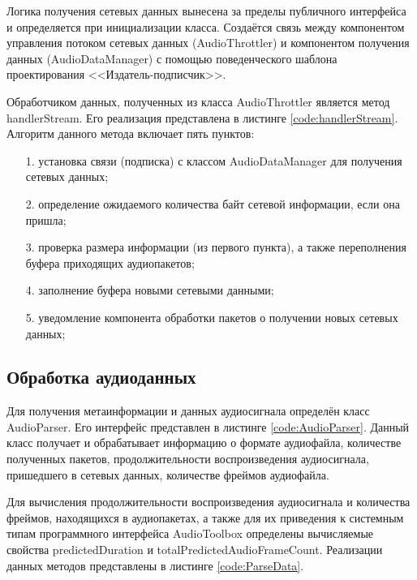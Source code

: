         \par Логика получения сетевых данных вынесена за пределы публичного интерфейса 
        и определяется при инициализации класса. 
        Создаётся связь между компонентом управления потоком сетевых данных (AudioThrottler) 
        и компонентом получения данных (AudioDataManager) с помощью поведенческого шаблона проектирования <<Издатель-подписчик>>.

        \par Обработчиком данных, полученных из класса AudioThrottler является метод handlerStream. 
        Его реализация представлена в листинге \ref{code:handlerStream}.
        Алгоритм данного метода включает пять пунктов:
        \begin{itemize}
            \item[1.] установка связи (подписка) с классом AudioDataManager для получения сетевых данных;
            \item[2.] определение ожидаемого количества байт сетевой информации, если она пришла;
            \item[3.] проверка размера информации (из первого пункта), а также переполнения буфера приходящих аудиопакетов;
            \item[4.] заполнение буфера новыми сетевыми данными;
            \item[5.] уведомление компонента обработки пакетов о получении новых сетевых данных;
        \end{itemize}

        
        
    \subsection{Обработка аудиоданных}
        \par Для получения метаинформации и данных аудиосигнала определён класс AudioParser. 
        Его интерфейс представлен в листинге \ref{code:AudioParser}.
        Данный класс получает и обрабатывает информацию о формате аудиофайла, количестве полученных пакетов,
        продолжительности воспроизведения аудиосигнала, пришедшего в сетевых данных, количестве фреймов аудиофайла.

        \par Для вычисления продолжительности воспроизведения аудиосигнала и количества фреймов, 
        находящихся в аудиопакетах, а также для их приведения к системным типам программного интерфейса AudioToolbox 
        определены вычисляемые свойства predictedDuration и totalPredictedAudioFrameCount. 
        Реализации данных методов представлены в листинге \ref{code:ParseData}.

